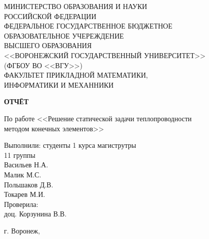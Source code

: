\begin{titlepage}
  \thispagestyle{empty}
  \begin{center}
  {
    \fontsize{16}{16}
    \selectfont
    \noindent
    МИНИСТЕРСТВО ОБРАЗОВАНИЯ И НАУКИ \\
    РОССИЙСКОЙ ФЕДЕРАЦИИ \\
    ФЕДЕРАЛЬНОЕ ГОСУДАРСТВЕННОЕ БЮДЖЕТНОЕ \\
    ОБРАЗОВАТЕЛЬНОЕ УЧЕРЕЖДЕНИЕ \\
    ВЫСШЕГО ОБРАЗОВАНИЯ \\
    <<ВОРОНЕЖСКИЙ ГОСУДАРСТВЕННЫЙ УНИВЕРСИТЕТ>> \\
    (ФГБОУ ВО <<ВГУ>>) \\
    ФАКУЛЬТЕТ ПРИКЛАДНОЙ МАТЕМАТИКИ, \\
    ИНФОРМАТИКИ И МЕХАННИКИ
  }

  \vspace{2cm}

  {
    \fontsize{16}{16}
    \selectfont
    \textbf{ОТЧЁТ}

    По работе <<Решение статической задачи теплопроводности \\
    методом конечных элементов>>
  }

  \vfill

  \begin{flushright}
    Выполнили: студенты 1 курса магиструтры \\
    11 группы \\
    Васильев Н.А. \\
    Малик М.С. \\
    Польшаков Д.В. \\
    Токарев М.И. \\
    Проверила: \\
    доц. Корзунина В.В.
  \end{flushright}

  \vfill

  г. Воронеж, \the\year
  \end{center}
\end{titlepage}

\clearpage
